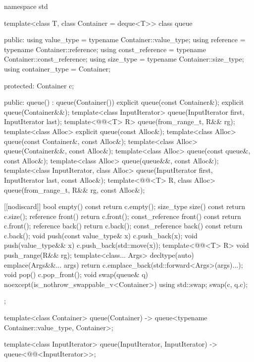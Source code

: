 \begin{codeblock}
namespace std {
  template<class T, class Container = deque<T>>
  class queue {
  public:
    using value_type      = typename Container::value_type;
    using reference       = typename Container::reference;
    using const_reference = typename Container::const_reference;
    using size_type       = typename Container::size_type;
    using container_type  =          Container;

  protected:
    Container c;

  public:
    queue() : queue(Container()) {}
    explicit queue(const Container&);
    explicit queue(Container&&);
    template<class InputIterator> queue(InputIterator first, InputIterator last);
    template<@@<T> R> queue(from_range_t, R&& rg);
    template<class Alloc> explicit queue(const Alloc&);
    template<class Alloc> queue(const Container&, const Alloc&);
    template<class Alloc> queue(Container&&, const Alloc&);
    template<class Alloc> queue(const queue&, const Alloc&);
    template<class Alloc> queue(queue&&, const Alloc&);
    template<class InputIterator, class Alloc>
      queue(InputIterator first, InputIterator last, const Alloc&);
    template<@@<T> R, class Alloc>
      queue(from_range_t, R&& rg, const Alloc&);

    [[nodiscard]] bool empty() const    { return c.empty(); }
    size_type         size()  const     { return c.size(); }
    reference         front()           { return c.front(); }
    const_reference   front() const     { return c.front(); }
    reference         back()            { return c.back(); }
    const_reference   back() const      { return c.back(); }
    void push(const value_type& x)      { c.push_back(x); }
    void push(value_type&& x)           { c.push_back(std::move(x)); }
    template<@@<T> R> void push_range(R&& rg);
    template<class... Args>
      decltype(auto) emplace(Args&&... args)
        { return c.emplace_back(std::forward<Args>(args)...); }
    void pop()                          { c.pop_front(); }
    void swap(queue& q) noexcept(is_nothrow_swappable_v<Container>)
      { using std::swap; swap(c, q.c); }
  };

  template<class Container>
    queue(Container) -> queue<typename Container::value_type, Container>;

  template<class InputIterator>
    queue(InputIterator, InputIterator) -> queue<@@<InputIterator>>;

}
\end{codeblock}
